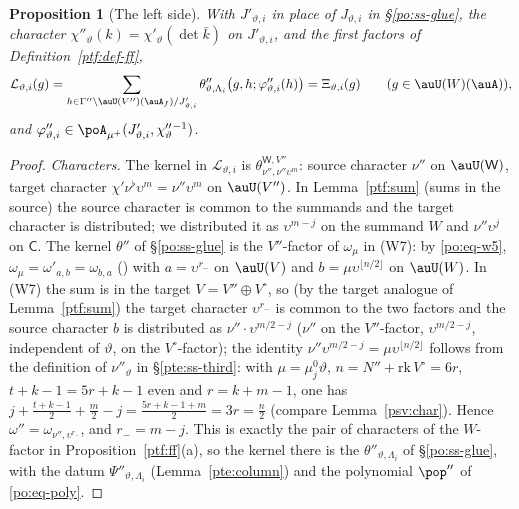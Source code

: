 \documentclass[10pt]{amsart}
\newtheorem{proposition}[theorem]{Proposition}
\theoremstyle{definition}
\theoremstyle{remark}
\begin{document}
\begin{proposition}[The left side]\label{ptf:leftside}
With $J'_{\vartheta,i}$ in place of $J_{\vartheta,i}$ in \S\ref{po:ss-glue}, the character $\chi''_\vartheta(k)=\chi'_\vartheta(\det\bar k)$ on
$J'_{\vartheta,i}$, and the first factors of Definition~\ref{ptf:def-ff},
\[
\mathcal L_{\vartheta,i}(g)=\sum_{h\in\Gamma''\backslash\auU(V'')(\auA_f)/J'_{\vartheta,i}}\theta''_{\vartheta,\Lambda_i}\bigl(g,h;\varphi''_{\vartheta,i}(h)\bigr)
=\Xi_{\vartheta,i}(g)\qquad(g\in\auU(W)(\auA)),
\]
and $\varphi''_{\vartheta,i}\in\poA_{\mu^+}(J'_{\vartheta,i},\chi''_\vartheta{}^{-1})$.
\end{proposition}
\begin{proof}
\emph{Characters.} The kernel in $\mathcal L_{\vartheta,i}$ is $\theta^{\mathsf W,V''}_{\nu'',\nu''\upsilon^m}$: source character $\nu''$
on $\auU(\mathsf W)$, target character $\chi'\nu^\flat\upsilon^m=\nu''\upsilon^m$ on $\auU(V'')$. In Lemma~\ref{ptf:sum} (sums in
the source) the source character is common to the summands and the target character is distributed; we
distributed it as $\upsilon^{m-j}$ on the summand $W$ and $\nu''\upsilon^j$ on $\mathsf C$. The kernel $\theta''$ of
\S\ref{po:ss-glue} is the $V''$-factor of $\omega_\mu$ in (W7): by \eqref{po:eq-w5}, $\omega_\mu=\omega'_{a,b}=\omega_{b,a}$
({\cite[(13)]{P53}}) with $a=\upsilon^{r_-}$ on $\auU(V)$ and $b=\mu\upsilon^{\lfloor n/2\rfloor}$ on $\auU(W)$. In (W7) the sum is in
the target $V=V''\oplus V^\circ$, so (by the target analogue of Lemma~\ref{ptf:sum}) the target character
$\upsilon^{r_-}$ is common to the two factors and the source character $b$ is distributed as $\nu''\cdot\upsilon^{m/2-j}$
($\nu''$ on the $V''$-factor, $\upsilon^{m/2-j}$, independent of $\vartheta$, on the $V^\circ$-factor); the identity
$\nu''\upsilon^{m/2-j}=\mu\upsilon^{\lfloor n/2\rfloor}$ follows from the definition of $\nu''_\vartheta$ in \S\ref{pte:ss-third}: with $\mu=\mu^0_j\vartheta$, $n=N''+
\mathrm{rk}\,V^\circ=6r$, $t+k-1=5r+k-1$ even and $r=k+m-1$, one has $j+\frac{t+k-1}2+\frac m2-j=\frac{5r+k-1+m}2=3r=\frac n2$
(compare Lemma~\ref{psv:char}). Hence $\omega''=\omega_{\nu'',\upsilon^{r_-}}$, and $r_-=m-j$. This is exactly the pair of characters of the
$W$-factor in Proposition~\ref{ptf:ff}(a), so the kernel there is the $\theta''_{\vartheta,\Lambda_i}$ of \S\ref{po:ss-glue},
with the datum $\Psi''_{\vartheta,\Lambda_i}$ (Lemma~\ref{pte:column}) and the polynomial $\pop''$ of \eqref{po:eq-poly}.


\end{proof}
\end{document}

